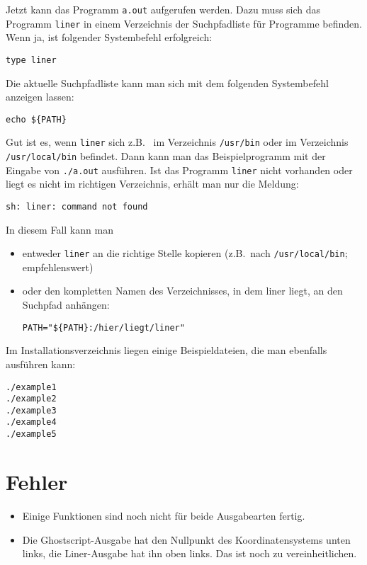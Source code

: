 \documentclass{article}
\begin{document}
Jetzt kann das Programm \verb_a.out_ aufgerufen werden.
Dazu muss sich das Programm \verb_liner_ in einem Verzeichnis der
Suchpfadliste f\"ur Programme befinden. Wenn ja, ist folgender
Systembefehl erfolgreich:
\begin{verbatim}
type liner
\end{verbatim}%
Die aktuelle Suchpfadliste kann
man sich mit dem folgenden Systembefehl anzeigen lassen:
\begin{verbatim}
echo ${PATH} 
\end{verbatim}%
Gut ist es, wenn \verb_liner_ sich z.B.~ im Verzeichnis \verb_/usr/bin_ 
oder im Verzeichnis \verb_/usr/local/bin_ befindet.
Dann kann man das Beispielprogramm mit der Eingabe von \verb_./a.out_ 
ausf\"uhren. 
Ist das Programm \verb_liner_ nicht vorhanden oder liegt es nicht im richtigen
Verzeichnis, erh\"alt man nur die Meldung: 
\begin{verbatim}
sh: liner: command not found
\end{verbatim}
In diesem Fall kann man 
\begin{itemize}
\item entweder \verb_liner_ an die richtige Stelle kopieren
      (z.B.~nach \verb_/usr/local/bin_; empfehlenswert)
\item oder den kompletten Namen des
      Verzeichnisses, in dem liner liegt, an den Suchpfad anh\"angen:
\begin{verbatim}
PATH="${PATH}:/hier/liegt/liner"
\end{verbatim}%
\end{itemize}

Im Installationsverzeichnis liegen einige Beispieldateien, die man
ebenfalls ausf\"uhren kann:
\begin{verbatim}
./example1
./example2
./example3
./example4
./example5
\end{verbatim}
\section{Fehler}
\begin{itemize}
\item Einige Funktionen sind noch nicht f\"ur beide Ausgabearten 
      fertig.
\item Die Ghostscript-Ausgabe hat den Nullpunkt des Koordinatensystems
      unten links, die Liner-Ausgabe hat ihn oben links. Das ist noch
      zu vereinheitlichen.
\end{itemize}
\end{document}
